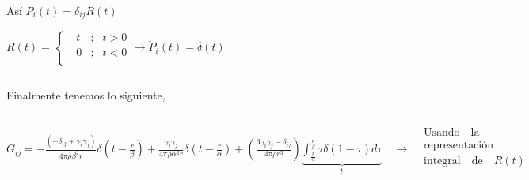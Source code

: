 \documentclass[a4paper,12pt]{article}
\begin{document}
Así $P_i(t)=\delta_{ij}R(t)$

$R(t)=\left\{
\begin{array}{ccrr}
&t&;&t>0\\
&0&;&t<0\\
\end{array}
\rightarrow \ddot{P}_i (t)=\delta(t)\right.$

$\quad$

Finalmente tenemos lo siguiente,

$\quad$
\begin{center}


$G_{ij}=-\frac{(-\delta_{ij}+\gamma_i\gamma_j)}{4\pi\rho\beta^2r}\delta\left(t-\frac{r}{\beta}\right)+\frac{\gamma_i\gamma_j}{4\pi\rho\alpha^2r}\delta\left(t-\frac{r}{\alpha}\right)+\left(\frac{3\gamma_i\gamma_j-\delta_{ij}}{4\pi\rho r^3}\right)\underbrace{\int_{\frac{r}{\alpha}}^{\frac{r}{\beta}}\tau\delta(1-\tau)d\tau}_{t}\quad\rightarrow \boxed{\begin{array}{lcr}  
&\text{Usando}\quad\text{la}\\     
&\text{representación}\quad\\   
&\text{integral}\quad\text{de}\quad R(t)\\  
&   
\end{array}}$
\end{center}
\end{document}
